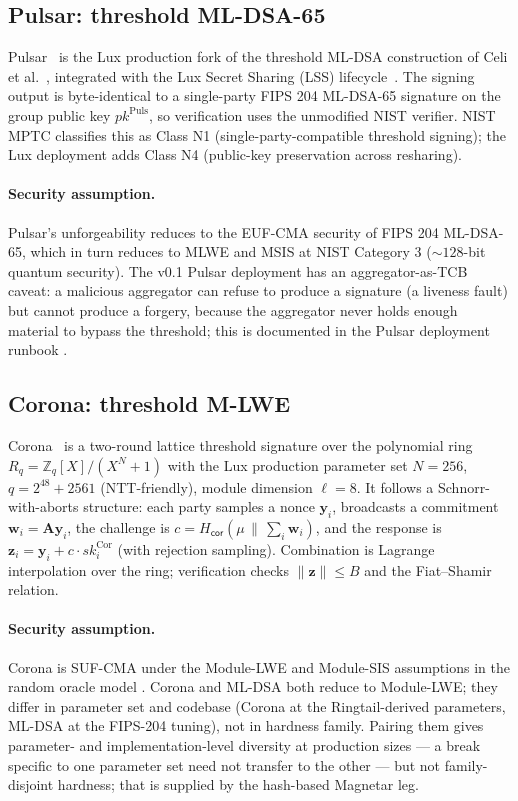 \subsection{Pulsar: threshold ML-DSA-65}

Pulsar~\cite{pulsar} is the Lux production fork of the threshold
ML-DSA construction of Celi et al.~\cite{tmldsa2025}, integrated with
the Lux Secret Sharing (LSS) lifecycle~\cite{luxlssmpc}. The signing
output is byte-identical to a single-party FIPS 204
\cite{fips204} ML-DSA-65 signature on the group public key
$\mathit{pk}^{\mathrm{Puls}}$, so verification uses the unmodified
NIST verifier. NIST MPTC \cite{nistir8214c} classifies this as Class
N1 (single-party-compatible threshold signing); the Lux deployment
adds Class N4 (public-key preservation across resharing).

\paragraph{Security assumption.}
Pulsar's unforgeability reduces to the EUF-CMA security of FIPS 204
ML-DSA-65, which in turn reduces to MLWE and MSIS at NIST Category 3
(${\sim}128$-bit quantum security). The v0.1 Pulsar deployment has
an aggregator-as-TCB caveat: a malicious aggregator can refuse to
produce a signature (a liveness fault) but cannot produce a forgery,
because the aggregator never holds enough material to bypass the
threshold; this is documented in the Pulsar deployment runbook
\cite{pulsar}.

\subsection{Corona: threshold M-LWE}

Corona~\cite{corona,ringtail} is a two-round lattice
threshold signature over the polynomial ring $R_q = \mathbb{Z}_q[X]/
(X^N+1)$ with the Lux production parameter set $N = 256$, $q =
2^{48} + 2561$ (NTT-friendly), module dimension $\ell = 8$. It
follows a Schnorr-with-aborts structure: each party samples a nonce
$\mathbf{y}_i$, broadcasts a commitment $\mathbf{w}_i = \mathbf{A}
\mathbf{y}_i$, the challenge is $c = H_{\mathsf{cor}}(\mu \,\|\, \sum_i
\mathbf{w}_i)$, and the response is $\mathbf{z}_i = \mathbf{y}_i + c
\cdot \mathit{sk}_i^{\mathrm{Cor}}$ (with rejection sampling).
Combination is Lagrange interpolation over the ring; verification
checks $\|\mathbf{z}\| \leq B$ and the Fiat--Shamir relation.

\paragraph{Security assumption.}
Corona is SUF-CMA under the Module-LWE and Module-SIS assumptions
in the random oracle model \cite{ringtail}. Corona and ML-DSA both
reduce to Module-LWE; they differ in parameter set and codebase
(Corona at the Ringtail-derived parameters, ML-DSA at the FIPS-204
tuning), not in hardness family. Pairing them gives parameter- and
implementation-level diversity at production sizes
\cite{albrechtestimator,bdgl2016} --- a break specific to one
parameter set need not transfer to the other --- but not
family-disjoint hardness; that is supplied by the hash-based
Magnetar leg.

